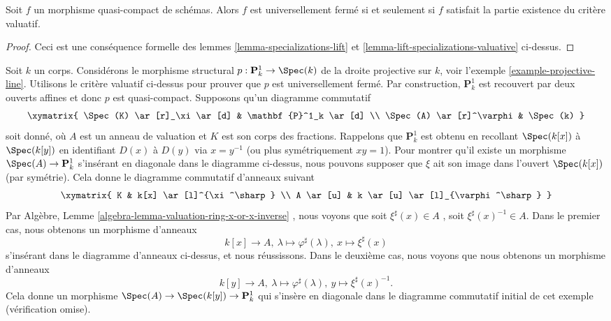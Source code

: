 \begin{proposition}
\label{proposition-characterize-universally-closed}
Soit  $f$  un morphisme quasi-compact de schémas. Alors  $f$  est
universellement fermé si et seulement si  $f$  satisfait la partie
existence du critère valuatif.
\end{proposition}

\begin{proof}
Ceci est une conséquence formelle des lemmes  \ref{lemma-specializations-lift}  et  \ref{lemma-lift-specializations-valuative} 
ci-dessus.
\end{proof}

\begin{example}
\label{example-projective-line-universally-closed}
Soit  $k$  un corps. Considérons le morphisme structural  $p : \mathbf{P}^1_k \to \Spec(k)$  de
la droite projective sur  $k$, voir l'exemple  \ref{example-projective-line}. Utilisons le
critère valuatif ci-dessus pour prouver que  $p$  est universellement
fermé. Par construction,  $\mathbf{P}^1_k$  est recouvert par deux ouverts affines et
donc  $p$  est quasi-compact. Supposons qu'un diagramme commutatif
$$
\xymatrix{
\Spec(K) \ar[r]_\xi \ar[d] & \mathbf{P}^1_k \ar[d] \\
\Spec(A) \ar[r]^\varphi & \Spec(k)
}
$$
soit donné, où  $A$  est un anneau de valuation et  $K$  est son
corps des fractions. Rappelons que  $\mathbf{P}^1_k$  est obtenu en recollant  $\Spec(k[x])$ 
à  $\Spec(k[y])$  en identifiant  $D(x)$  à  $D(y)$  via  $x = y^{-1}$  (ou plus
symétriquement  $xy = 1$). Pour montrer qu'il existe un morphisme  $\Spec(A) \to \mathbf{P}^1_k$ 
s'insérant en diagonale dans le diagramme ci-dessus, nous pouvons supposer que
 $\xi$  ait son image dans l'ouvert  $\Spec(k[x])$  (par symétrie). Cela donne le
diagramme commutatif d'anneaux suivant
$$
\xymatrix{
K & k[x] \ar[l]^{\xi^\sharp} \\
A \ar[u] & k \ar[u] \ar[l]_{\varphi^\sharp}
}
$$
Par Algèbre, Lemme  \ref{algebra-lemma-valuation-ring-x-or-x-inverse} , nous voyons que soit  $\xi^\sharp(x) \in A$ , soit
 $\xi^\sharp(x)^{-1} \in A$. Dans le premier cas, nous obtenons un morphisme d'anneaux
$$
k[x] \to A,
\ \lambda \mapsto \varphi^\sharp(\lambda),
\  x \mapsto \xi^\sharp(x)
$$
s'insérant dans le diagramme d'anneaux ci-dessus, et nous réussissons. Dans le
deuxième cas, nous voyons que nous obtenons un morphisme d'anneaux
$$
k[y] \to A,
\ \lambda \mapsto \varphi^\sharp(\lambda),
\ y \mapsto \xi^\sharp(x)^{-1}.
$$
Cela donne un morphisme  $\Spec(A) \to \Spec(k[y]) \to \mathbf{P}^1_k$  qui s'insère en diagonale dans le diagramme
commutatif initial de cet exemple (vérification omise).
\end{example}
